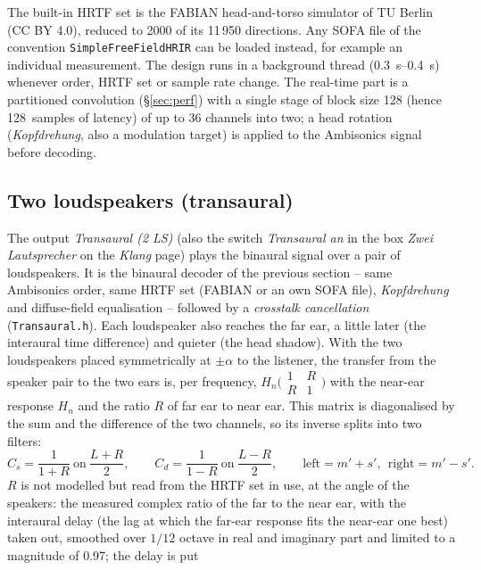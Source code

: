 \documentclass[11pt,a4paper,parskip=half,DIV=11,toc=bibliography]{scrartcl}
\newcommand{\ui}[1]{\emph{#1}}                 %
\newcommand{\code}[1]{\texttt{#1}}
\newcommand{\fn}[1]{\mbox{\texttt{#1}}}
\begin{document}
The built-in HRTF set is the FABIAN head-and-torso simulator of TU Berlin \citep{brinkmann2017fabian}
(CC BY 4.0), reduced to 2000 of its 11\,950 directions. Any SOFA file \citep{majdak2013sofa} of the
convention \code{SimpleFreeFieldHRIR} can be loaded instead, for example an individual measurement. The
design runs in a background thread (\SIrange{0.3}{0.4}{s}) whenever order, HRTF set or sample rate change.
The real-time part is a partitioned convolution (\S\ref{sec:perf}) with a single stage of block size 128
(hence \SI{128}{samples} of latency) of up to 36 channels into two; a head rotation (\ui{Kopfdrehung}, also a modulation target) is
applied to the Ambisonics signal before decoding.

\subsection{Two loudspeakers (transaural)}
\label{sec:transaural}
The output \ui{Transaural (2 LS)} (also the switch \ui{Transaural an} in the box \ui{Zwei Lautsprecher} on the \ui{Klang}
page) plays the binaural signal over a pair of loudspeakers. It is the binaural decoder of the previous section --
same Ambisonics order, same HRTF set (FABIAN or an own SOFA file), \ui{Kopfdrehung} and diffuse-field equalisation --
followed by a \emph{crosstalk cancellation} (\fn{Transaural.h}). Each loudspeaker also reaches the far ear, a little
later (the interaural time difference) and quieter (the head shadow). With the two loudspeakers placed symmetrically at
$\pm\alpha$ to the listener, the transfer from the speaker pair to the two ears is, per frequency, $H_n\bigl(\begin{smallmatrix}1&R\\R&1\end{smallmatrix}\bigr)$ with
the near-ear response $H_n$ and the ratio $R$ of far ear to near ear. This matrix is diagonalised by the sum and the
difference of the two channels, so its inverse splits into two filters:
\begin{equation}
  C_s = \frac{1}{1+R}\ \text{on}\ \frac{L+R}{2},\qquad C_d = \frac{1}{1-R}\ \text{on}\ \frac{L-R}{2},\qquad
  \text{left} = m' + s',\ \ \text{right} = m' - s'.
\end{equation}
$R$ is not modelled but read from the HRTF set in use, at the angle of the speakers: the measured complex ratio of the
far to the near ear, with the interaural delay (the lag at which the far-ear response fits the near-ear one best)
taken out, smoothed over $1/12$ octave in real and imaginary part and limited to a magnitude of 0.97; the delay is put
\end{document}
